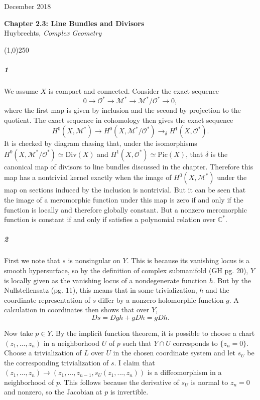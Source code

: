 \documentclass[10pt,letter]{article}
\begin{document}
\noindent 
December 2018
\begin{center}
\textbf{Chapter 2.3: Line Bundles and Divisors}\\ Huybrechts, \textit{Complex Geometry}

\line(1,0){250}
\end{center}
\subparagraph{1} We assume $X$ is compact and connected. Consider the exact sequence
\[ 0 \rightarrow \mathcal{O}^{\ast} \rightarrow \mathcal{M}^{\ast} \rightarrow \mathcal{M}^{\ast}/\mathcal{O}^{\ast} \rightarrow 0,\] where the first map is given by inclusion and the second by projection to the quotient.  The exact sequence in cohomology then gives the exact sequence
\[ H^{0}(X,\mathcal{M}^{\ast}) \rightarrow H^{0}(X,\mathcal{M}^{\ast}/\mathcal{O}^{\ast}) \rightarrow_{\delta} H^{1}(X,\mathcal{O}^{\ast}).\]
It is checked by diagram chasing that, under the isomorphisms $H^{0}(X,\mathcal{M}^{\ast}/\mathcal{O}^{\ast}) \simeq \text{Div}(X)$ and $H^{1}(X,\mathcal{O}^{\ast}) \simeq \text{Pic}(X)$, that $\delta$ is the canonical map of divisors to line bundles discussed in the chapter. Therefore this map has a nontrivial kernel exactly when the image of $H^{0}(X,\mathcal{M}^{\ast})$ under the map on sections induced by the inclusion is nontrivial. But it can be seen that the image of a meromorphic function under this map is zero if and only if the function is locally and therefore globally constant. But a nonzero meromorphic function is constant if and only if satisfies a polynomial relation over $\mathbb{C}^{\ast}$. 
\subparagraph{2} First we note that $s$ is nonsingular on $Y$. This is because its vanishing locus is a smooth hypersurface, so by the definition of complex submanifold (GH pg. 20), $Y$ is locally given as the vanishing locus of a nondegenerate function $h$. But by the Nullstellensatz (pg. 11), this means that in some trivialization, $h$ and the coordinate representation of $s$ differ by a nonzero holomorphic function $g$. A calculation in coordinates then shows that over $Y$, \[ Ds = Dg h + g Dh =  g Dh.\]

  Now take $p \in Y$. By the implicit function theorem, it is possible to choose a chart $(z_1,...,z_n)$ in a neighborhood $U$ of $p$ such that $Y \cap U$ corresponds to $\lbrace z_n = 0 \rbrace$. Choose a trivialization of $L$ over $U$ in the chosen coordinate system and let $s_U$ be the corresponding trivialization of $s$. I claim that $(z_1,...,z_n) \rightarrow (z_1,...,z_{n-1},s_{U}(z_1,...,z_n))$ is a diffeomorphism in a neighborhood of $p$. This follows because the derivative of $s_{U}$ is normal to $z_n = 0$ and nonzero, so the Jacobian at $p$ is invertible.
  
\end{document}
